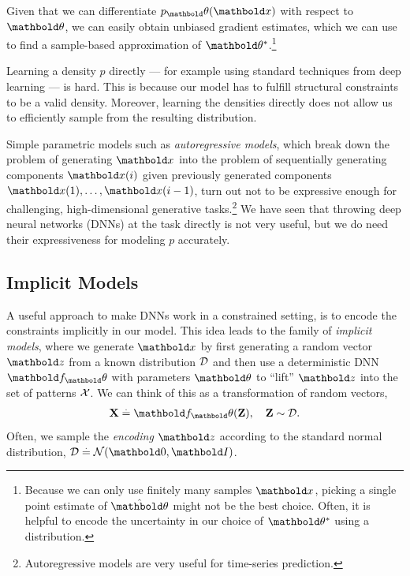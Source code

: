 \documentclass{tufte-handout}
\begin{document}
Given that we can differentiate $p_\vtheta(\vx)$ with respect to $\vtheta$, we can easily obtain unbiased gradient estimates, which we can use to find a sample-based approximation of $\s{\vtheta}$.\footnote{Because we can only use finitely many samples $\vx$, picking a single point estimate of $\hat{\vtheta}$ might not be the best choice. Often, it is helpful to encode the uncertainty in our choice of $\s{\vtheta}$ using a distribution.}

Learning a density $p$ directly --- for example using standard techniques from deep learning --- is hard. This is because our model has to fulfill structural constraints to be a valid density. Moreover, learning the densities directly does not allow us to efficiently sample from the resulting distribution.

Simple parametric models such as \emph{autoregressive models}, which break down the problem of generating $\vx$ into the problem of sequentially generating components $\vx(i)$ given previously generated components $\vx(1),\dots,\vx(i-1)$, turn out not to be expressive enough for challenging, high-dimensional generative tasks.\footnote{Autoregressive models are very useful for time-series prediction.} We have seen that throwing deep neural networks (DNNs) at the task directly is not very useful, but we do need their expressiveness for modeling $p$ accurately.

\subsection{Implicit Models}

A useful approach to make DNNs work in a constrained setting, is to encode the constraints implicitly in our model. This idea leads to the family of \emph{implicit models}, where we generate $\vx$ by first generating a random vector $\vz$ from a known distribution $\mathcal{D}$ and then use a deterministic DNN $\vf_\vtheta$ with parameters $\vtheta$ to ``lift'' $\vz$ into the set of patterns $\mathcal{X}$. We can think of this as a transformation of random vectors, \begin{align}
    \rX \defeq \vf_\vtheta(\rZ), \quad \rZ \sim \spa{D}.
\end{align} Often, we sample the \emph{encoding} $\vz$ according to the standard normal distribution, $\spa{D} \defeq \N{\vZero}{\mI}$.
\end{document}
